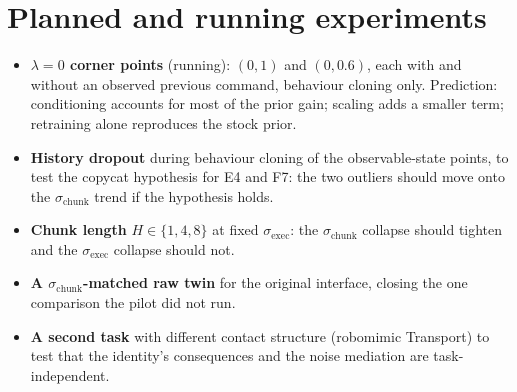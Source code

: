 \documentclass{article}
\newcommand{\sexec}{\sigma_{\mathrm{exec}}}
\newcommand{\schunk}{\sigma_{\mathrm{chunk}}}
\begin{document}
\section{Planned and running experiments}
\label{app:planned}
\begin{itemize}
\item \textbf{$\lambda=0$ corner points} (running): $(0,1)$ and $(0,0.6)$, each with and without an observed previous command, behaviour cloning only. Prediction: conditioning accounts for most of the prior gain; scaling adds a smaller term; retraining alone reproduces the stock prior.
\item \textbf{History dropout} during behaviour cloning of the observable-state points, to test the copycat hypothesis for E4 and F7: the two outliers should move onto the $\schunk$ trend if the hypothesis holds.
\item \textbf{Chunk length} $H\in\{1,4,8\}$ at fixed $\sexec$: the $\schunk$ collapse should tighten and the $\sexec$ collapse should not.
\item \textbf{A $\schunk$-matched raw twin} for the original interface, closing the one comparison the pilot did not run.
\item \textbf{A second task} with different contact structure (robomimic Transport) to test that the identity's consequences and the noise mediation are task-independent.
\end{itemize}
\end{document}
